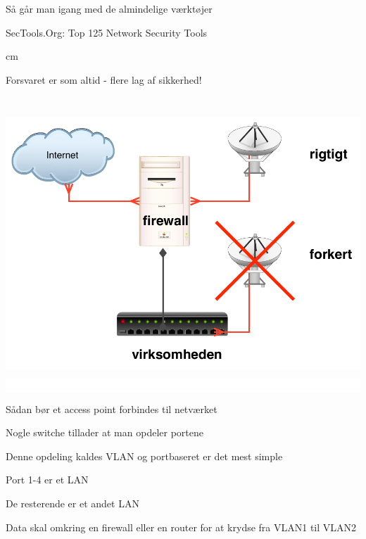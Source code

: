 \documentclass[20pt,landscape,a4paper,footrule]{foils}
\begin{document}

\begin{list1}
\item Så går man igang med de almindelige værktøjer
\item SecTools.Org: Top 125 Network Security Tools 
\end{list1}
 cm

\centerline{\hlkbig Forsvaret er som altid - flere lag af sikkerhed! }


\begin{center}
\colorbox{white}{\includegraphics[height=11cm]{images/wlan-accesspoint-2.pdf}}
\end{center}

\centerline{\hlkbig Sådan bør et access point forbindes til netværket}






\begin{list2}
\item Nogle switche tillader at man opdeler portene
\item Denne opdeling kaldes VLAN og portbaseret er det mest simple
\item Port 1-4 er et LAN
\item De resterende er et andet LAN
\item Data skal omkring en firewall eller en router for at krydse fra VLAN1 til VLAN2
\end{list2}
\end{document}
